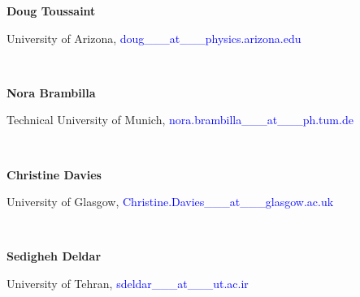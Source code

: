 \documentclass[a4paper,10pt]{article}
\begin{document}
\begin{minipage}[t]{0.25\textwidth}
\textbf{Doug Toussaint}
\end{minipage} \begin{minipage}[t]{0.75\textwidth} 
University of Arizona, \textcolor{blue}{doug\_\_\_at\_\_\_physics.arizona.edu}
\end{minipage} \\ 

\begin{minipage}[t]{0.25\textwidth}
\textbf{Nora Brambilla}
\end{minipage} \begin{minipage}[t]{0.75\textwidth} 
Technical University of Munich, \textcolor{blue}{nora.brambilla\_\_\_at\_\_\_ph.tum.de}
\end{minipage} \\ 

\begin{minipage}[t]{0.25\textwidth}
\textbf{Christine Davies}
\end{minipage} \begin{minipage}[t]{0.75\textwidth} 
University of Glasgow, \textcolor{blue}{Christine.Davies\_\_\_at\_\_\_glasgow.ac.uk}
\end{minipage} \\ 
 
\begin{minipage}[t]{0.25\textwidth}
\textbf{Sedigheh Deldar}
\end{minipage} \begin{minipage}[t]{0.75\textwidth} 
University of Tehran, \textcolor{blue}{sdeldar\_\_\_at\_\_\_ut.ac.ir}
\end{minipage} \\
\end{document}
